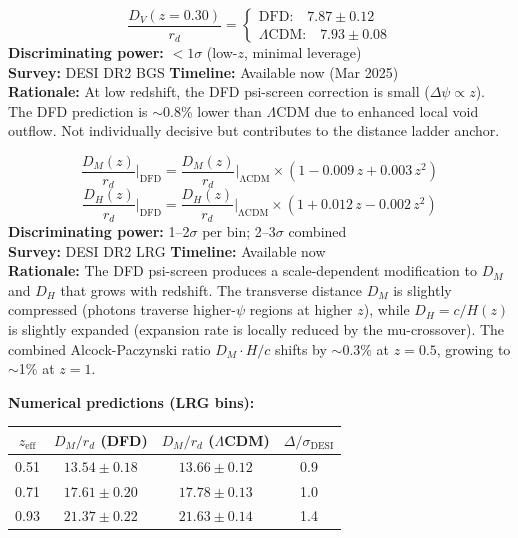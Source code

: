 \documentclass[12pt]{article}
\newcommand{\LCDM}{$\Lambda$CDM}
\begin{document}
\begin{predbox}[Prediction D1: BAO Isotropic Distance --- BGS ($z_\mathrm{eff}=0.30$)]
\begin{equation}
\boxed{
\frac{D_V(z=0.30)}{r_d} = \begin{cases}
\text{DFD:}\quad 7.87 \pm 0.12 \\
\text{\LCDM:}\quad 7.93 \pm 0.08
\end{cases}
}
\end{equation}
\textbf{Discriminating power:} $<1\sigma$ (low-$z$, minimal leverage)\\
\textbf{Survey:} DESI DR2 BGS \quad\textbf{Timeline:} Available now (Mar 2025)\\
\textbf{Rationale:} At low redshift, the DFD psi-screen correction is small ($\Delta\psi \propto z$). The DFD prediction is $\sim$0.8\% lower than \LCDM{} due to enhanced local void outflow. Not individually decisive but contributes to the distance ladder anchor.
\end{predbox}

\begin{predbox}[Prediction D2: BAO Anisotropic Distances --- LRG ($z_\mathrm{eff}=0.51$, $0.71$, $0.93$)]
\begin{equation}
\boxed{
\frac{D_M(z)}{r_d}\bigg|_\mathrm{DFD} = \frac{D_M(z)}{r_d}\bigg|_\mathrm{\Lambda CDM} \times \left(1 - 0.009\,z + 0.003\,z^2\right)
}
\end{equation}
\begin{equation}
\boxed{
\frac{D_H(z)}{r_d}\bigg|_\mathrm{DFD} = \frac{D_H(z)}{r_d}\bigg|_\mathrm{\Lambda CDM} \times \left(1 + 0.012\,z - 0.002\,z^2\right)
}
\end{equation}
\textbf{Discriminating power:} 1--2$\sigma$ per bin; 2--3$\sigma$ combined\\
\textbf{Survey:} DESI DR2 LRG \quad\textbf{Timeline:} Available now\\
\textbf{Rationale:} The DFD psi-screen produces a scale-dependent modification to $D_M$ and $D_H$ that grows with redshift. The transverse distance $D_M$ is slightly compressed (photons traverse higher-$\psi$ regions at higher $z$), while $D_H = c/H(z)$ is slightly expanded (expansion rate is locally reduced by the mu-crossover). The combined Alcock-Paczynski ratio $D_M \cdot H/c$ shifts by $\sim$0.3\% at $z=0.5$, growing to $\sim$1\% at $z=1$.

\medskip\noindent
\textbf{Numerical predictions (LRG bins):}
\begin{center}
\begin{tabular}{cccc}
\toprule
$z_\mathrm{eff}$ & $D_M/r_d$ (DFD) & $D_M/r_d$ (\LCDM) & $\Delta/\sigma_\mathrm{DESI}$ \\
\midrule
0.51 & $13.54 \pm 0.18$ & $13.66 \pm 0.12$ & 0.9 \\
0.71 & $17.61 \pm 0.20$ & $17.78 \pm 0.13$ & 1.0 \\
0.93 & $21.37 \pm 0.22$ & $21.63 \pm 0.14$ & 1.4 \\
\bottomrule
\end{tabular}
\end{center}
\end{predbox}
\end{document}
